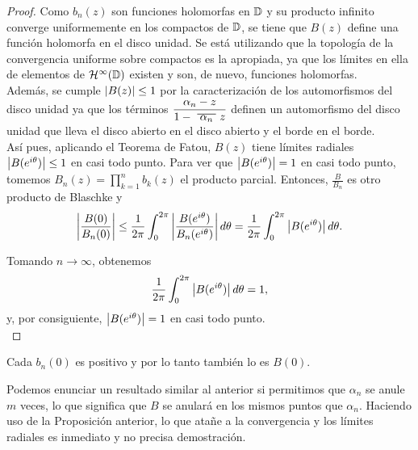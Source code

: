 \begin{proof}
    Como $b_n(z)$ son funciones holomorfas en $\mathbb{D}$ y su producto infinito converge uniformemente en los compactos de $\mathbb{D}$, se tiene que $B(z)$ define una función holomorfa en el disco unidad. Se está utilizando que la topología de la convergencia uniforme sobre compactos es la apropiada, ya que los límites en ella de elementos de $\mathcal{H}^{\infty}(\mathbb{D})$ existen y son, de nuevo, funciones holomorfas. \\ %

    Además, se cumple $\left\lvert B(z)\right\rvert \leq 1$ por la caracterización de los automorfismos del disco unidad ya que los términos $\dfrac{\alpha_n - z}{1 - \xbar{\alpha_n}z}$ definen un automorfismo del disco unidad que lleva el disco abierto en el disco abierto y el borde en el borde. \\

    Así pues, aplicando el Teorema de Fatou, $B(z)$ tiene límites radiales $\left\lvert B(e^{i\theta})\right\rvert \leq 1$ en casi todo punto. Para ver que $\left\lvert B(e^{i \theta})\right\rvert = 1$ en casi todo punto, tomemos $B_n(z) = \prod_{k=1}^{n} b_k(z)$ el producto parcial. Entonces, $\frac{B}{B_n}$ es otro producto de Blaschke y
    \begin{equation*}
        \left\lvert\frac{B(0)}{B_n(0)}\right\rvert \leq \frac{1}{2 \pi} \int_{0}^{2 \pi} \left\lvert\frac{B(e^{i \theta})}{B_n(e^{i \theta})}\right\rvert d \theta = \frac{1}{2 \pi}  \int_{0}^{2 \pi} \left\lvert B(e^{i \theta})\right\rvert d \theta.
    \end{equation*}

    Tomando $n \to \infty$, obtenemos
    \begin{equation*}
         \frac{1}{2 \pi}  \int_{0}^{2 \pi} \left\lvert B(e^{i \theta})\right\rvert d \theta = 1,
    \end{equation*}
    y, por consiguiente, $\left\lvert B(e^{i \theta})\right\rvert = 1$ en casi todo punto. \\
\end{proof}

\begin{obs}
     Cada $b_n(0)$ es positivo y por lo tanto también lo es $B(0)$. \\
\end{obs}

Podemos enunciar un resultado similar al anterior si permitimos que $\alpha_n$ se anule $m$ veces, lo que significa que $B$ se anulará en los mismos puntos que $\alpha_n$. Haciendo uso de la Proposición anterior, lo que atañe a la convergencia y los límites radiales es inmediato y no precisa demostración. \\

